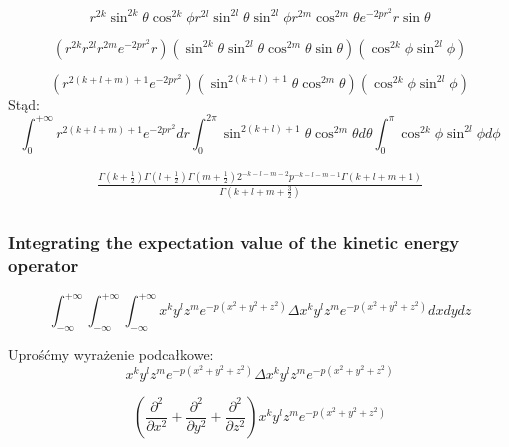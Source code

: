 \begin{equation}
	r^{2k} \sin^{2k}{\theta} \cos^{2k}{\phi} 
	r^{2l} \sin^{2l}{\theta}  \sin^{2l}{\phi} 
	r^{2m} \cos^{2m}{\theta} 
	e^{-2p r^2} 
	r \sin{\theta}
\end{equation}

\begin{equation}
	(r^{2k} r^{2l} r^{2m} e^{-2p r^2} r)
	(\sin^{2k}{\theta}\sin^{2l}{\theta} \cos^{2m}{\theta}  \sin{\theta} )
	(\cos^{2k}{\phi}   \sin^{2l}{\phi} )
\end{equation}

\begin{equation}
	(r^{2(k+l+m)+1} e^{-2p r^2})
	(\sin^{2(k+l)+1}{\theta}\cos^{2m}{\theta})
	(\cos^{2k}{\phi}   \sin^{2l}{\phi} )
\end{equation}
Stąd:
\begin{equation}
	\int_{0}^{+\infty} r^{2(k+l+m)+1} e^{-2p r^2} d r
	\int_{0}^{2\pi} \sin^{2(k+l)+1}{\theta}\cos^{2m}{\theta} d\theta
	\int_{0}^{\pi} \cos^{2k}{\phi}   \sin^{2l}{\phi} d\phi
\end{equation}

\begin{multline}
	\frac{\Gamma \left(k+\frac{1}{2}\right) \Gamma \left(l+\frac{1}{2}\right) \Gamma \left(m+\frac{1}{2}\right) 2^{-k-l-m-2} p^{-k-l-m-1} \Gamma (k+l+m+1)}{\Gamma\left(k+l+m+\frac{3}{2}\right)} \\
\end{multline}

\subsubsection{Integrating the expectation value of the kinetic energy operator}
\begin{equation}
	\int_{-\infty}^{+\infty} \int_{-\infty}^{+\infty} \int_{-\infty}^{+\infty} 
	x^k y^l z^m e^{-p (x^2+y^2+z^2)} \Delta x^k y^l z^m e^{-p(x^2+y^2+z^2)}
	dx dy dz
\end{equation}

Uprośćmy wyrażenie podcałkowe:
\begin{equation}
	x^k y^l z^m e^{-p (x^2+y^2+z^2)} \Delta x^k y^l z^m e^{-p(x^2+y^2+z^2)}
\end{equation}

\begin{equation}
	(\frac{\partial^2}{\partial x^2} + \frac{\partial^2}{\partial y^2} + \frac{\partial^2}{\partial z^2})x^k y^l z^m e^{-p(x^2+y^2+z^2)}
\end{equation}

